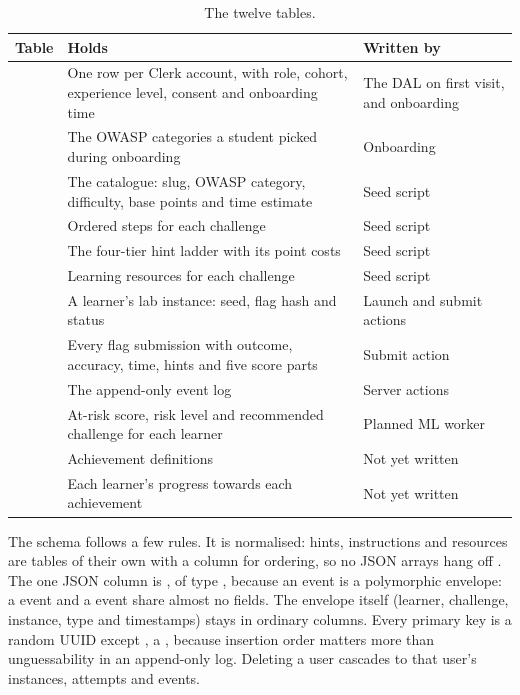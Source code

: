 
\begin{table}[!htbp]
\centering
\caption{The twelve tables.}
\label{tab:tables}
\tablefont
\begin{tabularx}{\linewidth}{@{}P{4.5cm} L P{3.0cm}@{}}
\toprule
\textbf{Table} & \textbf{Holds} & \textbf{Written by} \\
\midrule
{} & One row per Clerk account, with role, cohort, experience level, consent and onboarding time & The DAL on first visit, and onboarding \\
 & The OWASP categories a student picked during onboarding & Onboarding \\
 & The catalogue: slug, OWASP category, difficulty, base points and time estimate & Seed script \\
 & Ordered steps for each challenge & Seed script \\
 & The four-tier hint ladder with its point costs & Seed script \\
 & Learning resources for each challenge & Seed script \\
 & A learner's lab instance: seed, flag hash and status & Launch and submit actions \\
 & Every flag submission with outcome, accuracy, time, hints and five score parts & Submit action \\
 & The append-only event log & Server actions \\
 & At-risk score, risk level and recommended challenge for each learner & Planned ML worker \\
 & Achievement definitions & Not yet written \\
 & Each learner's progress towards each achievement & Not yet written \\
\bottomrule
\end{tabularx}
\end{table}

The schema follows a few rules. It is normalised: hints, instructions and resources are tables of their own with a  column for ordering, so no JSON arrays hang off . The one JSON column is , of type , because an event is a polymorphic envelope: a  event and a  event share almost no fields. The envelope itself (learner, challenge, instance, type and timestamps) stays in ordinary columns. Every primary key is a random UUID except , a , because insertion order matters more than unguessability in an append-only log. Deleting a user cascades to that user's instances, attempts and events.

